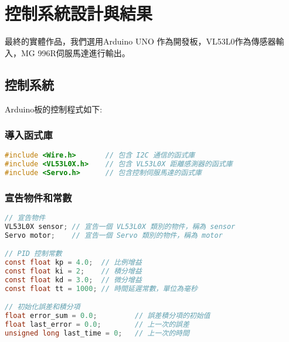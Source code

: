 \newpage
\section{控制系統設計與結果}
	最終的實體作品，我們選用Arduino UNO 作為開發板，VL53L0作為傳感器輸入，MG 996R伺服馬達進行輸出。



\subsection{控制系統}
Arduino板的控制程式如下:





\subsubsection{導入函式庫}
\begin{lstlisting}[language=C]
#include <Wire.h>       // 包含 I2C 通信的函式庫
#include <VL53L0X.h>    // 包含 VL53L0X 距離感測器的函式庫
#include <Servo.h>      // 包含控制伺服馬達的函式庫
\end{lstlisting}

\subsubsection{宣告物件和常數}
\begin{lstlisting}[language=C]
// 宣告物件
VL53L0X sensor; // 宣告一個 VL53L0X 類別的物件，稱為 sensor
Servo motor;    // 宣告一個 Servo 類別的物件，稱為 motor

// PID 控制常數
const float kp = 4.0;  // 比例增益
const float ki = 2;    // 積分增益
const float kd = 3.0;  // 微分增益
const float tt = 1000; // 時間延遲常數，單位為毫秒

// 初始化誤差和積分項
float error_sum = 0.0;         // 誤差積分項的初始值
float last_error = 0.0;        // 上一次的誤差
unsigned long last_time = 0;   // 上一次的時間
\end{lstlisting}

